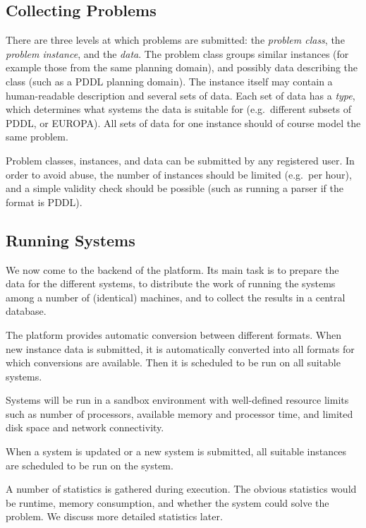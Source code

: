 \subsection{Collecting Problems}

There are three levels at which problems are submitted: the \emph{problem class}, the \emph{problem instance}, and the \emph{data}. The problem class groups similar instances (for example those from the same planning domain), and possibly data describing the class (such as a PDDL planning domain). The instance itself may contain a human-readable description and several sets of data. Each set of data has a \emph{type}, which determines what systems the data is suitable for (e.g.\ different subsets of PDDL, or EUROPA). All sets of data for one instance should of course model the same problem.

Problem classes, instances, and data can be submitted by any registered user. In order to avoid abuse, the number of instances should be limited (e.g.\ per hour), and a simple validity check should be possible (such as running a parser if the format is PDDL).

\subsection{Running Systems}

We now come to the backend of the platform. Its main task is to prepare the data for the different systems, to distribute the work of running the systems among a number of (identical) machines, and to collect the results in a central database.

The platform provides automatic conversion between different formats. When new instance data is submitted, it is automatically converted into all formats for which conversions are available. Then it is scheduled to be run on all suitable systems.

Systems will be run in a sandbox environment with well-defined resource limits such as number of processors, available memory and processor time, and limited disk space and network connectivity.

When a system is updated or a new system is submitted, all suitable instances are scheduled to be run on the system.

A number of statistics is gathered during execution. The obvious statistics would be runtime, memory consumption, and whether the system could solve the problem. We discuss more detailed statistics later.

